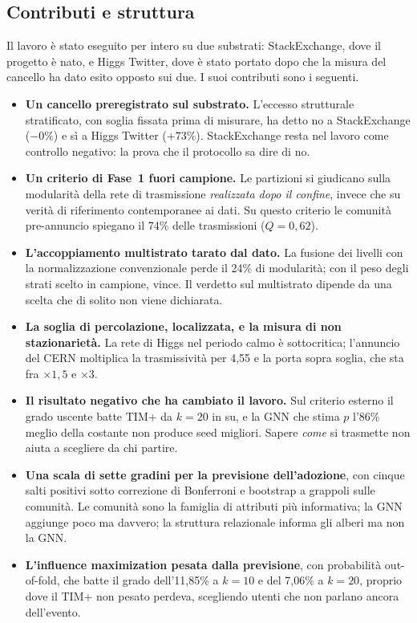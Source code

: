 \documentclass[11pt,a4paper]{article}
\newcommand{\sx}{StackExchange}
\newcommand{\hg}{Higgs Twitter}
\begin{document}
\subsection{Contributi e struttura}
Il lavoro è stato eseguito per intero su due substrati: \sx{}, dove il progetto è nato, e \hg{}, dove è stato portato dopo che la misura del cancello ha dato esito opposto sui due. I suoi contributi sono i seguenti.
\begin{itemize}
  \item \textbf{Un cancello preregistrato sul substrato.} L'eccesso strutturale stratificato, con soglia fissata prima di misurare, ha detto no a \sx{} ($-0\%$) e sì a \hg{} ($+73\%$). \sx{} resta nel lavoro come controllo negativo: la prova che il protocollo sa dire di no.
  \item \textbf{Un criterio di Fase~1 fuori campione.} Le partizioni si giudicano sulla modularità della rete di trasmissione \emph{realizzata dopo il confine}, invece che su verità di riferimento contemporanee ai dati. Su questo criterio le comunità pre-annuncio spiegano il 74\% delle trasmissioni ($Q = 0{,}62$).
  \item \textbf{L'accoppiamento multistrato tarato dal dato.} La fusione dei livelli con la normalizzazione convenzionale perde il 24\% di modularità; con il peso degli strati scelto in campione, vince. Il verdetto sul multistrato dipende da una scelta che di solito non viene dichiarata.
  \item \textbf{La soglia di percolazione, localizzata, e la misura di non stazionarietà.} La rete di Higgs nel periodo calmo è sottocritica; l'annuncio del CERN moltiplica la trasmissività per 4,55 e la porta sopra soglia, che sta fra $\times 1{,}5$ e $\times 3$.
  \item \textbf{Il risultato negativo che ha cambiato il lavoro.} Sul criterio esterno il grado uscente batte TIM+ da $k = 20$ in su, e la GNN che stima $p$ l'86\% meglio della costante non produce seed migliori. Sapere \emph{come} si trasmette non aiuta a scegliere da chi partire.
  \item \textbf{Una scala di sette gradini per la previsione dell'adozione}, con cinque salti positivi sotto correzione di Bonferroni e bootstrap a grappoli sulle comunità. Le comunità sono la famiglia di attributi più informativa; la GNN aggiunge poco ma davvero; la struttura relazionale informa gli alberi ma non la GNN.
  \item \textbf{L'influence maximization pesata dalla previsione}, con probabilità out-of-fold, che batte il grado dell'11,85\% a $k = 10$ e del 7,06\% a $k = 20$, proprio dove il TIM+ non pesato perdeva, scegliendo utenti che non parlano ancora dell'evento.
\end{itemize}
\end{document}
